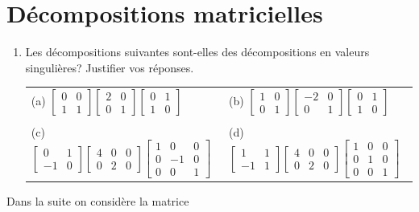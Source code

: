 \documentclass[11pt]{article}
\begin{document}
\section{Décompositions matricielles}
\begin{enumerate}
	\item Les décompositions suivantes sont-elles des décompositions en valeurs singulières? Justifier vos réponses.
	
	\begin{tabular}{ll}
	\\
		(a) $\displaystyle \begin{bmatrix} 0 & 0 \\ 1 & 1\end{bmatrix}  \begin{bmatrix} 2 & 0 \\ 0 & 1 \end{bmatrix} \begin{bmatrix} 0 & 1 \\ 1 & 0\end{bmatrix}$
		&
		(b) $\displaystyle \begin{bmatrix} 1 & 0 \\ 0 & 1\end{bmatrix}  \begin{bmatrix} -2 & 0 \\ 0 & 1 \end{bmatrix} \begin{bmatrix} 0 & 1 \\ 1 & 0\end{bmatrix}$\\ \\
		(c) $\displaystyle \begin{bmatrix} 0 & 1 \\ -1 & 0\end{bmatrix}  \begin{bmatrix} 4 & 0 & 0 \\ 0 & 2 & 0 \end{bmatrix} \begin{bmatrix} 1 & 0 & 0 \\ 0 & -1 & 0 \\ 0 & 0 & 1 \end{bmatrix}$
		&
		(d) $\displaystyle \begin{bmatrix} 1 & 1 \\ -1 & 1\end{bmatrix}  \begin{bmatrix} 4 & 0 & 0 \\ 0 & 2 & 0 \end{bmatrix} \begin{bmatrix} 1 & 0 & 0 \\ 0 & 1 & 0 \\ 0 & 0 & 1 \end{bmatrix}$
	\end{tabular}
\end{enumerate}
Dans la suite on considère la matrice
\end{document}
